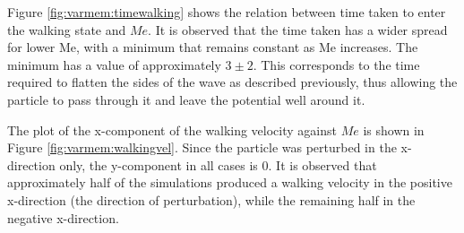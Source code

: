 Figure \ref{fig:varmem:timewalking} shows the relation between time taken to enter the walking state and $Me$. It is observed that the time taken has a wider spread for lower Me, with a minimum that remains constant as Me increases. The minimum has a value of approximately $3\pm2$. This corresponds to the time required to flatten the sides of the wave as described previously, thus allowing the particle to pass through it and leave the potential well around it.

The plot of the x-component of the walking velocity against $Me$ is shown in Figure \ref{fig:varmem:walkingvel}. Since the particle was perturbed in the x-direction only, the y-component in all cases is 0. It is observed that approximately half of the simulations produced a walking velocity in the positive x-direction (the direction of perturbation), while the remaining half in the negative x-direction. 



